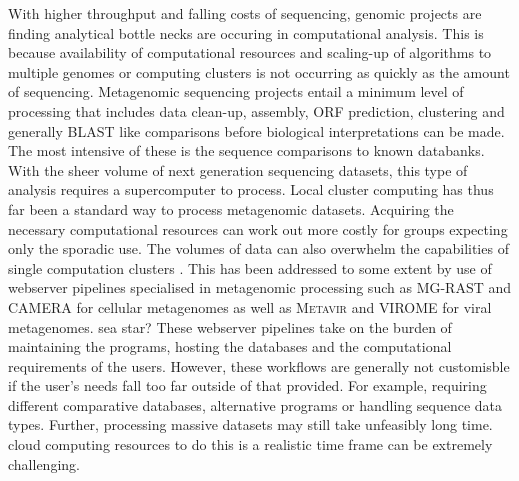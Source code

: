 With higher throughput and falling costs of sequencing, genomic projects are finding analytical bottle necks are occuring in computational analysis.
This is because availability of computational resources and scaling-up of algorithms to multiple genomes or computing clusters is not occurring as quickly as the amount of sequencing.
Metagenomic sequencing projects entail a minimum level of processing that includes data clean-up, assembly, \ac{ORF} prediction, clustering and generally \ac{BLAST} like comparisons before biological interpretations can be made.
The most intensive of these is the sequence comparisons to known databanks.
With the sheer volume of next generation sequencing datasets, this type of analysis requires a supercomputer to process.
Local cluster computing has thus far been a standard way to process metagenomic datasets. 
Acquiring the necessary computational resources can work out more costly for groups expecting only the sporadic use.
The volumes of data can also overwhelm the capabilities of single computation clusters \cite{Iverson2012}.
This has been addressed to some extent by use of webserver pipelines specialised in metagenomic processing such as \ac{MG-RAST} \cite{Meyer2008} and \ac{CAMERA} \cite{Sun2011} for cellular metagenomes as well as \textsc{Metavir} \cite{Roux2011} and \textsc{VIROME} \cite{Wommack2012} for viral metagenomes. sea star?
These webserver pipelines take on the burden of maintaining the programs, hosting the databases and the computational requirements of the users.
However, these workflows are generally not customisble if the user's needs fall too far outside of that provided. 
For example, requiring different comparative databases, alternative programs or handling sequence data types.
Further, processing massive datasets may still take unfeasibly long time.
cloud computing resources \cite{}
to do this is a realistic time frame can be extremely challenging.



